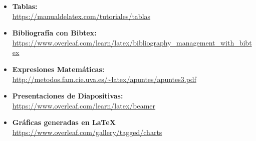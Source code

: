\documentclass{report}
\begin{document}
\begin{itemize}
    \item \textbf{Tablas:} \\
    \url{https://manualdelatex.com/tutoriales/tablas}
    
    \item \textbf{Bibliografía con Bibtex:}\\
    \url{https://www.overleaf.com/learn/latex/bibliography_management_with_bibtex}
    
    \item \textbf{Expresiones Matemáticas:}\\
    \url{http://metodos.fam.cie.uva.es/~latex/apuntes/apuntes3.pdf}
    
    \item \textbf{Presentaciones de Diapositivas:}\\
    \url{https://www.overleaf.com/learn/latex/beamer}
    
    \item \textbf{Gráficas generadas en \LaTeX}\\
    \url{https://www.overleaf.com/gallery/tagged/charts}    
\end{itemize}



%

\end{document}
